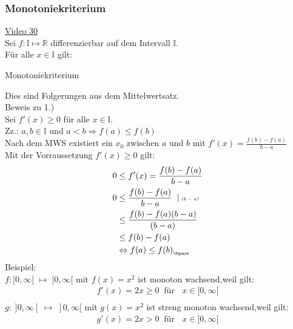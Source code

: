 \subsubsection{Monotoniekriterium}
\href{https://youtu.be/K_BfNKGb46I}{Video 30}\\
Sei $ f: \mathbb{I}\longmapsto \mathbb{R} $ differenzierbar auf dem Intervall $ \mathbb{I} $.\\
Für alle $ x\in \mathbb{I} $ gilt:\\
\begin{center}
	Monotoniekriterium\\
\end{center}
Dies sind Folgerungen aus dem Mittelwertsatz.\\
Beweis zu 1.)\\
Sei $ f'(x)\geq 0 $ für alle $ x\in \mathbb{I} $.\\
Zz.: $ a,b\in \mathbb{I} $ und $ a<b\Rightarrow f(a)\leq f(b) $\\
Nach dem MWS existiert ein $ x_0 $ zwischen $ a $ und $ b $ mit $ f'(x)=\frac{f(b)-f(a)}{b-a} $\\
Mit der Vorraussetzung $ f'(x)\geq 0 $ gilt:\\
\begin{align*}
0&\leq f'(x)=\frac{f(b)-f(a)}{b-a} \\
0&\leq\frac{f(b)-f(a)}{b-a} \;\;|\text{\tiny $ \cdot (b-a) $ }\\
&\leq\frac{f(b)-f(a)(b-a)}{(b-a)} \\
&\leq f(b)-f(a)\\
&\Leftrightarrow f(a)\leq f(b)_{_{\Square}}
\end{align*}
Beispiel:\\
\textbullet\;\; $ f:[0,\infty[\;\longmapsto \;[0,\infty[ $ mit $ f(x)=x^2 $ ist monoton wachsend,weil gilt:\\
\begin{align*}
f'(x)=2x\geq 0 \;\;\text{für }\;\;x\in [0,\infty[\\
\end{align*}
\textbullet\;\; $ g:\;]0,\infty[\;\longmapsto \;]0,\infty[ $ mit $ g(x)=x^2 $ ist streng monoton wachsend,weil gilt:\\
\begin{align*}
g'(x)=2x > 0 \;\;\text{für }\;\;x\in ]0,\infty[\\
\end{align*}
